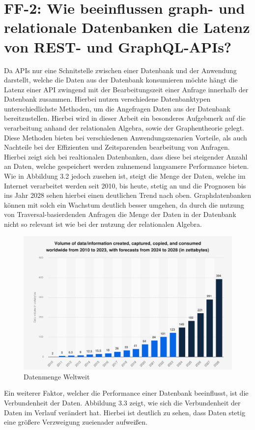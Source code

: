 \section{FF-2: Wie beeinflussen graph- und relationale Datenbanken die Latenz von REST- und GraphQL-APIs?} %
\label{sec:ff2}
Da APIs nur eine Schnitstelle zwischen einer Datenbank und der Anwendung darstellt, welche die Daten aus der Datenbank konsumieren möchte hängt die Latenz einer API zwingend mit der Bearbeitungszeit einer Anfrage innerhalb der Datenbank zusammen. Hierbei nutzen verschiedene Datenbanktypen unterschiedlichste Methoden, um die Angefragen Daten aus der Datenbank bereitzustellen. Hierbei wird in dieser Arbeit ein besonderes Aufgebmerk auf die verarbeitung anhand der relationalen Algebra, sowie der Graphentheorie gelegt. Diese Methoden bieten bei verschiedenen Anwendungszenarien Vorteile, als auch Nachteile bei der Effizienten und Zeitsparenden bearbeitung von Anfragen. Hierbei zeigt sich bei realtionalen Datenbanken, dass diese bei steigender Anzahl an Daten, welche gespeichert werden zuhnemend langsamere Performance bieten.
Wie in Abbildung 3.2 jedoch zusehen ist, steigt die Menge der Daten, welche im Internet verarbeitet werden seit 2010, bis heute, stetig an und die Prognosen bis ins Jahr 2028 sehen hierbei einen deutlichen Trend nach oben. Graphdatenbanken können mit solch ein Wachstum deutlich besser umgehen, da durch die nutzung von Traversal-basierdenden Anfragen die Menge der Daten in der Datenbank nicht so relevant ist wie bei der nutzung der relationalen Algebra.  \citep{9677042} \citep{performancenosql}
\begin{figure}[H]
	\centering
	\includegraphics[scale=.4]{Illustrations/growthofdata.png}
	\caption{Datenmenge Weltweit \citep{statista}}
\end{figure}
\noindent
Ein weiterer Faktor, welcher die Performance einer Datenbank beeinflusst, ist die Verbundenheit der Daten. Abbildung 3.3 zeigt, wie sich die Verbundenheit der Daten im Verlauf verändert hat. Hierbei ist deutlich zu sehen, dass Daten stetig eine größere Verzweigung zueienader aufweißen. 

